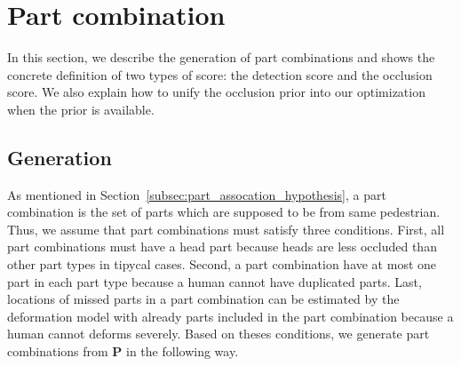 \documentclass[10pt,twocolumn,letterpaper]{article}
\begin{document}
\section{Part combination}
\label{sec:part_combination}
In this section, we describe the generation of part combinations and shows the concrete definition of two types of score: the detection score and the occlusion score. We also explain how to unify the occlusion prior into our optimization when the prior is available.

\subsection{Generation}
\label{subsec:generation}
As mentioned in Section~\ref{subsec:part_assocation_hypothesis}, a part combination is the set of parts which are supposed to be from same pedestrian.
Thus, we assume that part combinations must satisfy three conditions.
First, all part combinations must have a head part because heads are less occluded than other part types in tipycal cases.
Second, a part combination have at most one part in each part type because a human cannot have duplicated parts.
Last, locations of missed parts in a part combination can be estimated by the deformation model with already parts included in the part combination because a human cannot deforms severely.
Based on theses conditions, we generate part combinations from $\mathbf{P}$ in the following way.
\end{document}
